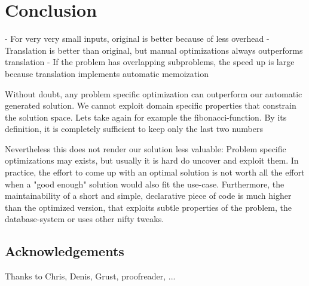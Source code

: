 \chapter{Conclusion} \label{conclusion}


- For very very small inputs, original is better because of less overhead
- Translation is better than original, but manual optimizations always outperforms translation
- If the problem has overlapping subproblems, the speed up is large because translation implements automatic memoization


Without doubt, any problem specific optimization can outperform our automatic generated solution. We cannot exploit domain specific properties that constrain the solution space. Lets take again for example the fibonacci-function. By its definition, it is completely sufficient to keep only the last two numbers 

Nevertheless this does not render our solution less valuable: Problem specific optimizations may exists, but usually it is hard do uncover and exploit them. In practice, the effort to come up with an optimal solution is not worth all the effort when a "good enough" solution would also fit the use-case. Furthermore, the maintainability of a short and simple, declarative piece of code is much higher than the optimized version, that exploits subtle properties of the problem, the database-system or uses other nifty tweaks.

\section*{Acknowledgements}
Thanks to Chris, Denis, Grust, proofreader, ...